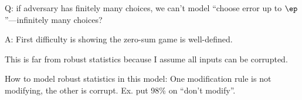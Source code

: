 Q: if adversary has finitely many choices, we can't model ``choose error up to $\ep$''---infinitely many choices?

A: First difficulty is showing the zero-sum game is well-defined. 

This is far from robust statistics because I assume all inputs can be corrupted. 

How to model robust statistics in this model: One modification rule is not modifying, the other is corrupt. Ex. put 98\% on ``don't modify''. %
